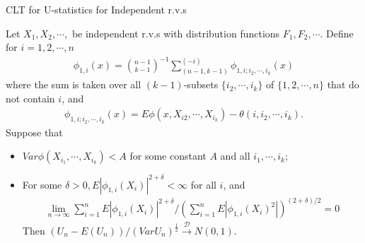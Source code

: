 \documentclass{beamer}
\theoremstyle{definition}
\numberwithin{Def}{section}
\begin{document}
    
    \begin{frame}{CLT for U-statistics for Independent r.v.s}
    \begin{fontsize}{6}{12}

    \begin{theorem}
     Let $X_1, X_2, \cdots,$ be independent r.v.s with distribution functions $F_1, F_2, \cdots$. Define for $i = 1,2, \cdots, n$
    \begin{align}
        \phi_{1,i} (x) = {n-1 \choose k-1}^{-1} \sum_{(n-1, k-1)}^{(-i)} \phi_{1, i; i_2, \cdots, i_k}(x)
    \end{align}
    where the sum is taken over all $(k-1)$-subsets $\{i_2, \cdots, i_k\}$ of $\{1,2, \cdots, n\}$ that do not contain $i$, and 
    \begin{align}
        \phi_{1, i; i_2, \cdots, i_k}(x) = E \phi(x, X_{i2}, \cdots, X_{i_k}) - \theta(i, i_2, \cdots, i_k).
    \end{align}
    Suppose that 
    \begin{itemize}
        \item $Var \phi(X_{i_1}, \cdots, X_{i_k} ) < A$ for some constant $A$ and all $i_1, \cdots, i_k$;
        \item For some $\delta > 0, E|\phi_{1, i} (X_i) |^{2 + \delta} < \infty$ for all $i$, and 
        \begin{align}
            \lim_{n \rightarrow \infty} \sum_{i =1}^{n} E|\phi_{1, i} (X_i) |^{2 + \delta} \Big/ (\sum_{i =1}^{n} E|\phi_{1, i} (X_i)^2 |) ^{(2 + \delta)/2} = 0
        \end{align}
       Then $(U_n - E(U_n)) / (Var U_n)^{\frac{1}{2}} \xrightarrow{\mathcal{D}} N(0,1).$ 
    \end{itemize}
    \end{theorem}
    \end{fontsize}
  \end{frame}
\end{document}
